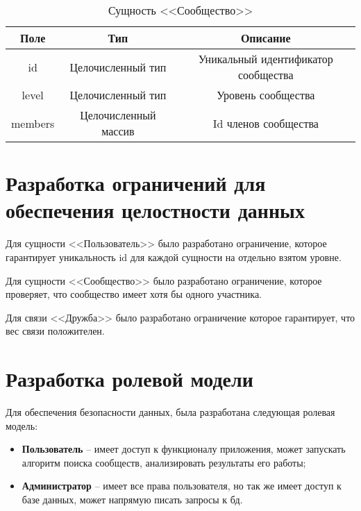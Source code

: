 \begin{table}[H]
	\begin{center}
		\begin{threeparttable}
			\caption{Сущность <<Сообщество>>}
			\label{tbl:com}
			\begin{tabular}{|c|c|c|}
			\hline
			\textbf{Поле} & \textbf{Тип} & \textbf{Описание} \\
			\hline
			id & Целочисленный тип & Уникальный идентификатор сообщества \\
			\hline
			level & Целочисленный тип & Уровень сообщества \\
			\hline
			members & Целочисленный массив & Id членов сообщества \\
			\hline
			\end{tabular}
		\end{threeparttable}
	\end{center}
\end{table}

\section{Разработка ограничений для обеспечения целостности данных}

Для сущности <<Пользователь>> было разработано ограничение, которое гарантирует уникальность id для каждой сущности на отдельно взятом уровне.

Для сущности <<Сообщество>> было разработано ограничение, которое проверяет, что сообщество имеет хотя бы одного участника.

Для связи <<Дружба>> было разработано ограничение которое гарантирует, что вес связи положителен.

\section{Разработка ролевой модели}

Для обеспечения безопасности данных, была разработана следующая ролевая модель:

\begin{itemize}
\item \textbf{Пользователь} -- имеет доступ к функционалу приложения, может запускать алгоритм поиска сообществ, анализировать результаты его работы;
\item \textbf{Администратор} -- имеет все права пользователя, но так же имеет доступ к базе данных, может напрямую писать запросы к бд.
\end{itemize}

